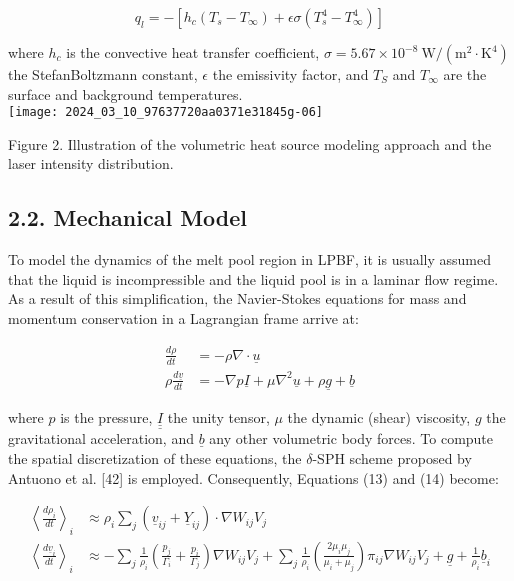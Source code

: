 \documentclass[10pt]{article}
\begin{document}
\begin{equation*}
q_{l}=-\left[h_{c}\left(T_{s}-T_{\infty}\right)+\epsilon \sigma\left(T_{s}^{4}-T_{\infty}^{4}\right)\right] \tag{12}
\end{equation*}


where $h_{c}$ is the convective heat transfer coefficient, $\sigma=5.67 \times 10^{-8} \mathrm{~W} /\left(\mathrm{m}^{2} \cdot \mathrm{K}^{4}\right)$ the StefanBoltzmann constant, $\epsilon$ the emissivity factor, and $T_{S}$ and $T_{\infty}$ are the surface and background temperatures.\\
\texttt{[image: 2024\_03\_10\_97637720aa0371e31845g-06]}

Figure 2. Illustration of the volumetric heat source modeling approach and the laser intensity distribution.

\subsection*{2.2. Mechanical Model}
To model the dynamics of the melt pool region in LPBF, it is usually assumed that the liquid is incompressible and the liquid pool is in a laminar flow regime. As a result of this simplification, the Navier-Stokes equations for mass and momentum conservation in a Lagrangian frame arrive at:


\begin{align*}
\frac{d \rho}{d t} & =-\rho \nabla \cdot \underline{u}  \tag{13}\\
\rho \frac{d \underline{v}}{d t} & =-\nabla p \underline{I}+\mu \nabla^{2} \underline{u}+\rho \underline{g}+\underline{b} \tag{14}
\end{align*}


where $p$ is the pressure, $\underline{\underline{I}}$ the unity tensor, $\mu$ the dynamic (shear) viscosity, $g$ the gravitational acceleration, and $\underline{b}$ any other volumetric body forces. To compute the spatial discretization of these equations, the $\delta$-SPH scheme proposed by Antuono et al. [42] is employed. Consequently, Equations (13) and (14) become:


\begin{align*}
\left\langle\frac{d \rho_{i}}{d t}\right\rangle_{i} & \approx \rho_{i} \sum_{j}\left(\underline{v}_{i j}+\underline{Y}_{i j}\right) \cdot \nabla W_{i j} V_{j}  \tag{15}\\
\left\langle\frac{d \underline{v}_{i}}{d t}\right\rangle_{i} & \approx-\sum_{j} \frac{1}{\rho_{i}}\left(\frac{p_{j}}{\Gamma_{i}}+\frac{p_{i}}{\Gamma_{j}}\right) \nabla W_{i j} V_{j}+\sum_{j} \frac{1}{\rho_{i}}\left(\frac{2 \mu_{i} \mu_{j}}{\mu_{i}+\mu_{j}}\right) \pi_{i j} \nabla W_{i j} V_{j}+\underline{g}+\frac{1}{\rho_{i}} \underline{b}_{i} \tag{16}
\end{align*}
\end{document}
